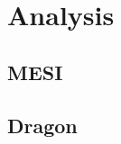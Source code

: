 \documentclass{article}
\begin{document}
\section{Analysis}

\subsection{MESI}

\subsection{Dragon}
\end{document}
